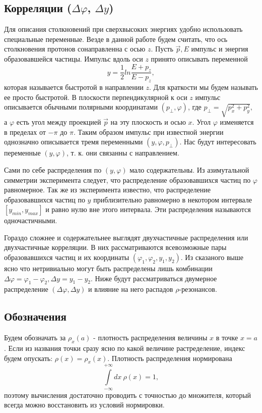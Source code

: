 \documentclass[12pt]{article}
\renewcommand{\phi}{\varphi}
\newcommand{\rint}{\int\limits_{-\infty}^{+\infty}}
\def\Dphi{\Delta\phi}
\def\Dy{\Delta y}
\begin{document}
\subsection{Корреляции ($\Dphi$, $\Dy$)}
\qquad Для описания столкновений при сверхвысоких энергиях удобно использовать специальные переменные. Везде в данной работе будем считать, что ось столкновения протонов сонаправленна с осью $z$. Пусть $\vec p, E$ импульс и энергия образовавшейся частицы. Импульс вдоль оси $z$ принято описывать переменной $$y = \frac{1}{2} ln \frac{E + p_z}{E - p_z},$$ которая называется быстротой в направлении $z$. Для краткости мы будем называть ее просто быстротой. В плоскости перпендикулярной к оси $z$ импульс описывается обычными полярными координатами $(p_\perp, \phi)$, где $p_\perp = \sqrt{p_x^2 + p_y^2},$ а $\phi$ есть угол между проекцией $\vec p$ на эту плоскость и осью $x$. Угол $\phi$ изменяется в пределах от $-\pi$ до $\pi$. Таким образом импульс при известной энергии однозначно описывается тремя переменными $(y, \phi, p_\perp)$. Нас будут интересовать переменные $(y, \phi)$, т. к. они связанны с направлением.

Сами по себе распределения по $(y, \phi)$ мало содержательны. Из азимутальной симметрии эксперимента следует, что распределение образовавшихся частиц по $\phi$ равномерное. Так же из эксперимента известно, что распределение образовавшихся частиц по $y$ приблизительно равномерно в некотором интервале $[y_{min}, y_{max}]$ и равно нулю вне этого интервала. Эти распределения называются одночастичными.

Гораздо сложнее и содержательнее выглядят двухчастичные распределения или двухчастичные корреляции. В них рассматриваются всевозможные пары образовавшихся частиц и их координаты $(\phi_1, \phi_2, y_1, y_2)$. Из сказаного выше ясно что нетривиально могут быть распределены лишь комбинации $\Dphi = \phi_1 - \phi_2, \Dy = y_1 - y_2$. Ниже будут рассматриваться двумерное распределение $(\Dphi, \Dy)$ и влияние на него распадов $\rho$-резонансов.

\subsection{Обозначения}
\qquad Будем обозначать за $\rho_x (a)$ - плотность распределения величины $x$ в точке $x = a$. Если из названия точки сразу ясно по какой величине растределение, индекс будем опускать: $\rho(x) = \rho_x (x)$. Плотность распределения нормирована
$$\rint dx\ \rho (x) = 1,$$
поэтому вычисления достаточно проводить с точностью до множителя, который всегда можно восстановить из условий нормировки.
\end{document}
